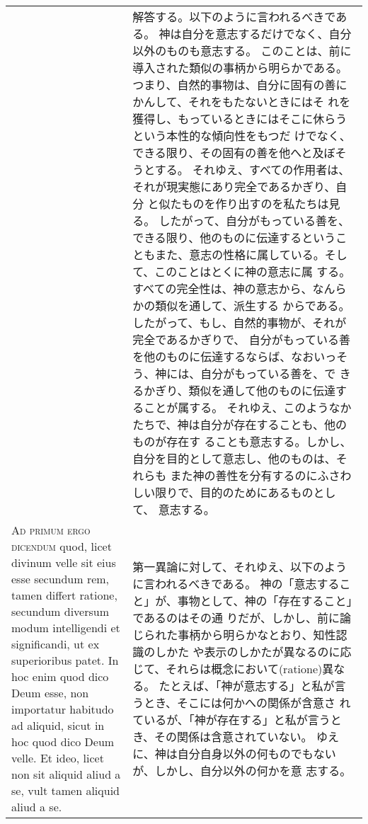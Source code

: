 \documentclass[10pt]{jsarticle} %
\begin{document}
\begin{longtable}{p{21em}p{21em}}
&

解答する。以下のように言われるべきである。
神は自分を意志するだけでなく、自分以外のものも意志する。
このことは、前に導入された類似の事柄から明らかである。
つまり、自然的事物は、自分に固有の善にかんして、それをもたないときにはそ
 れを獲得し、もっているときにはそこに休らうという本性的な傾向性をもつだ
 けでなく、できる限り、その固有の善を他へと及ぼそうとする。
それゆえ、すべての作用者は、それが現実態にあり完全であるかぎり、自分
 と似たものを作り出すのを私たちは見る。
したがって、自分がもっている善を、できる限り、他のものに伝達するというこ
 ともまた、意志の性格に属している。そして、このことはとくに神の意志に属
 する。すべての完全性は、神の意志から、なんらかの類似を通して、派生する
 からである。したがって、もし、自然的事物が、それが完全であるかぎりで、
 自分がもっている善を他のものに伝達するならば、なおいっそう、神には、自分がもっている善を、で
 きるかぎり、類似を通して他のものに伝達することが属する。
それゆえ、このようなかたちで、神は自分が存在することも、他のものが存在す
 ることも意志する。しかし、自分を目的として意志し、他のものは、それらも
 また神の善性を分有するのにふさわしい限りで、目的のためにあるものとして、
 意志する。




\\





{\scshape Ad primum ergo dicendum} quod, licet divinum velle sit eius
 esse secundum rem, tamen differt ratione, secundum diversum modum
 intelligendi et significandi, ut ex superioribus patet. In hoc enim
 quod dico Deum esse, non importatur habitudo ad aliquid, sicut in hoc
 quod dico Deum velle. Et ideo, licet non sit aliquid aliud a se, vult
 tamen aliquid aliud a se.


&

第一異論に対して、それゆえ、以下のように言われるべきである。
神の「意志すること」が、事物として、神の「存在すること」であるのはその通
 りだが、しかし、前に論じられた事柄から明らかなとおり、知性認識のしかた
 や表示のしかたが異なるのに応じて、それらは概念において(ratione)異なる。
 たとえば、「神が意志する」と私が言うとき、そこには何かへの関係が含意さ
 れているが、「神が存在する」と私が言うとき、その関係は含意されていない。
 ゆえに、神は自分自身以外の何ものでもないが、しかし、自分以外の何かを意
 志する。



\\






\end{longtable}
\end{document}
